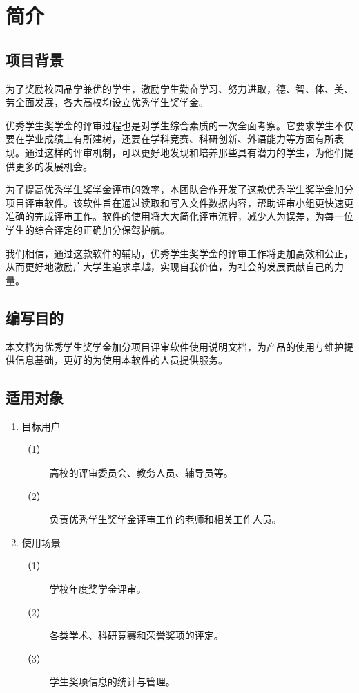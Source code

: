 	\chapter{简介}	%
\setcounter{page}{1} %
\section{项目背景}
为了奖励校园品学兼优的学生，激励学生勤奋学习、努力进取，德、智、体、美、劳全面发展，各大高校均设立优秀学生奖学金。

优秀学生奖学金的评审过程也是对学生综合素质的一次全面考察。它要求学生不仅要在学业成绩上有所建树，还要在学科竞赛、科研创新、外语能力等方面有所表现。通过这样的评审机制，可以更好地发现和培养那些具有潜力的学生，为他们提供更多的发展机会。

为了提高优秀学生奖学金评审的效率，本团队合作开发了这款优秀学生奖学金加分项目评审软件。该软件旨在通过读取和写入文件数据内容，帮助评审小组更快速更准确的完成评审工作。软件的使用将大大简化评审流程，减少人为误差，为每一位学生的综合评定的正确加分保驾护航。

我们相信，通过这款软件的辅助，优秀学生奖学金的评审工作将更加高效和公正，从而更好地激励广大学生追求卓越，实现自我价值，为社会的发展贡献自己的力量。

\section{编写目的}

本文档为优秀学生奖学金加分项目评审软件使用说明文档，为产品的使用与维护提供信息基础，更好的为使用本软件的人员提供服务。

\section{适用对象}
\begin{enumerate}
	\item 目标用户
	\begin{description}
		\item[（1）] 高校的评审委员会、教务人员、辅导员等。
		\item[（2）] 负责优秀学生奖学金评审工作的老师和相关工作人员。
	\end{description}
	\item 使用场景
	\begin{description}
		\item[（1）] 学校年度奖学金评审。
		\item[（2）] 各类学术、科研竞赛和荣誉奖项的评定。
		\item[（3）] 学生奖项信息的统计与管理。
	\end{description}
\end{enumerate}

